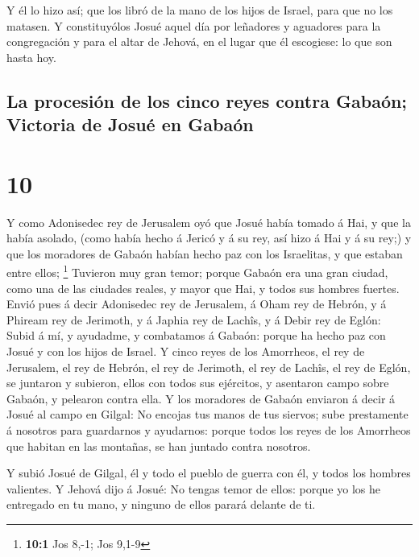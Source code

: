  Y él lo hizo así; que los libró de la mano de los hijos
de Israel, para que no los matasen.  Y constituyólos
Josué aquel día por leñadores y aguadores para la congregación y para el
altar de Jehová, en el lugar que él escogiese: lo que son hasta hoy.

\hypertarget{la-procesiuxf3n-de-los-cinco-reyes-contra-gabauxf3n-victoria-de-josuuxe9-en-gabauxf3n}{%
\subsection{La procesión de los cinco reyes contra Gabaón; Victoria de
Josué en
Gabaón}\label{la-procesiuxf3n-de-los-cinco-reyes-contra-gabauxf3n-victoria-de-josuuxe9-en-gabauxf3n}}

\hypertarget{section-9}{%
\section{10}\label{section-9}}

 Y como Adonisedec rey de Jerusalem oyó que Josué había
tomado á Hai, y que la había asolado, (como había hecho á Jericó y á su
rey, así hizo á Hai y á su rey;) y que los moradores de Gabaón habían
hecho paz con los Israelitas, y que estaban entre ellos; \footnote{\textbf{10:1}
  Jos 8,-1; Jos 9,1-9}  Tuvieron muy gran temor; porque
Gabaón era una gran ciudad, como una de las ciudades reales, y mayor que
Hai, y todos sus hombres fuertes.  Envió pues á decir
Adonisedec rey de Jerusalem, á Oham rey de Hebrón, y á Phiream rey de
Jerimoth, y á Japhia rey de Lachîs, y á Debir rey de Eglón:
 Subid á mí, y ayudadme, y combatamos á Gabaón: porque ha
hecho paz con Josué y con los hijos de Israel.  Y cinco
reyes de los Amorrheos, el rey de Jerusalem, el rey de Hebrón, el rey de
Jerimoth, el rey de Lachîs, el rey de Eglón, se juntaron y subieron,
ellos con todos sus ejércitos, y asentaron campo sobre Gabaón, y
pelearon contra ella.  Y los moradores de Gabaón enviaron
á decir á Josué al campo en Gilgal: No encojas tus manos de tus siervos;
sube prestamente á nosotros para guardarnos y ayudarnos: porque todos
los reyes de los Amorrheos que habitan en las montañas, se han juntado
contra nosotros.

 Y subió Josué de Gilgal, él y todo el pueblo de guerra
con él, y todos los hombres valientes.  Y Jehová dijo á
Josué: No tengas temor de ellos: porque yo los he entregado en tu mano,
y ninguno de ellos parará delante de ti.

